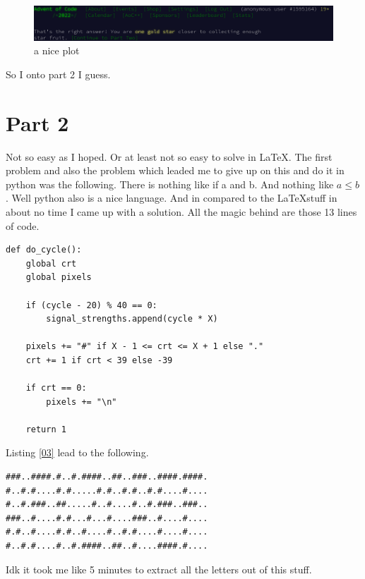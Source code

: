 \documentclass{article}
\begin{document}
\begin{figure}[h]
    \centering
    \includegraphics[width=1\textwidth]{ui.png}
    \caption{a nice plot}
    \label{02}
\end{figure}

So I onto part 2 I guess.

\section{Part 2}

Not so easy as I hoped.
Or at least not so easy to solve in \LaTeX.
The first problem and also the problem which leaded me to give up on this and do it in python was the following.
There is nothing like if a and b. 
And nothing like $a \leq b$.\newline
Well python also is a nice language.
And in compared to the \LaTeX stuff in about no time I came up with a solution.
All the magic behind are those 13 lines of code.

\begin{lstlisting}[caption=doing python, label=03, captionpos=b]
    def do_cycle():
    global crt
    global pixels

    if (cycle - 20) % 40 == 0:
        signal_strengths.append(cycle * X)

    pixels += "#" if X - 1 <= crt <= X + 1 else "."
    crt += 1 if crt < 39 else -39

    if crt == 0:
        pixels += "\n"

    return 1
\end{lstlisting}

Listing \ref{03} lead to the following.

\begin{lstlisting}[caption=help me to read, label=04, captionpos=b]
###..####.#..#.####..##..###..####.####.
#..#.#....#.#.....#.#..#.#..#.#....#....
#..#.###..##.....#..#....#..#.###..###..
###..#....#.#...#...#....###..#....#....
#.#..#....#.#..#....#..#.#....#....#....
#..#.#....#..#.####..##..#....####.#....
\end{lstlisting}

Idk it took me like 5 minutes to extract all the letters out of this stuff.
\end{document}
